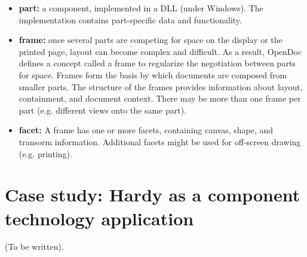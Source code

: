 \begin{itemize}
\item {\bf part:} a component, implemented in a DLL (under Windows).
The implementation contains part-specific data and functionality.
\item {\bf frame:} once several parts are competing for space on the display or the printed
page, layout can become complex and difficult. As a result, OpenDoc
defines  a concept called a frame to regularize the negotiation between parts for space.
Frames form the basis by which documents are composed from smaller parts.
The structure of the frames provides information about layout,
containment, and document context. There may be more than one frame per
part (e.g. different views onto the same part).
\item {\bf facet:} A frame has one or more facets, containing canvas, shape,
and transorm information. Additional facets might be used for
off-screen drawing (e.g. printing).
\end{itemize}


\section{Case study: Hardy as a component technology application}

(To be written).


